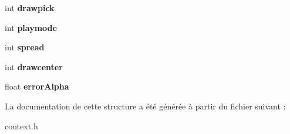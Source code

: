 \begin{DoxyCompactItemize}
\item 
\hypertarget{structcontext_a3d99a9e2fdae8652db4aa612f8d9cd96}{int {\bfseries drawpick}}\label{structcontext_a3d99a9e2fdae8652db4aa612f8d9cd96}

\item 
\hypertarget{structcontext_aa49a4684df5eedf20a5c1589e381b00e}{int {\bfseries playmode}}\label{structcontext_aa49a4684df5eedf20a5c1589e381b00e}

\item 
\hypertarget{structcontext_a9fcb2da8648b09e9271722def1ad799a}{int {\bfseries spread}}\label{structcontext_a9fcb2da8648b09e9271722def1ad799a}

\item 
\hypertarget{structcontext_a8d7f4c9045fb7c63976525d5d9af55db}{int {\bfseries drawcenter}}\label{structcontext_a8d7f4c9045fb7c63976525d5d9af55db}

\item 
\hypertarget{structcontext_a7b00bfb3a7e69c510dd27c1872cbacd3}{float {\bfseries error\-Alpha}}\label{structcontext_a7b00bfb3a7e69c510dd27c1872cbacd3}

\end{DoxyCompactItemize}


La documentation de cette structure a été générée à partir du fichier suivant \-:\begin{DoxyCompactItemize}
\item 
context.\-h\end{DoxyCompactItemize}
